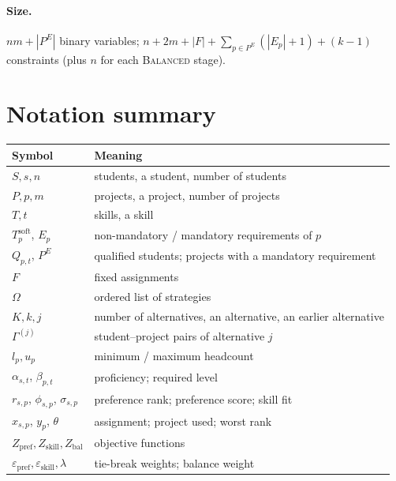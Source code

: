 \documentclass[11pt,a4paper]{article}
\newcommand{\soft}{\mathrm{soft}}
\begin{document}
\paragraph{Size.} $nm + |P^{E}|$ binary variables; $n + 2m + |F| + \sum_{p \in P^{E}} (|E_p| + 1) + (k-1)$ constraints (plus $n$
for each \textsc{Balanced} stage).

\section{Notation summary}
\begin{tabular}{ll}
\toprule
Symbol & Meaning \\
\midrule
$S, s, n$ & students, a student, number of students \\
$P, p, m$ & projects, a project, number of projects \\
$T, t$ & skills, a skill \\
$T_p^{\soft}$, $E_p$ & non-mandatory / mandatory requirements of $p$ \\
$Q_{p,t}$, $P^{E}$ & qualified students; projects with a mandatory requirement \\
$F$ & fixed assignments \\
$\Omega$ & ordered list of strategies \\
$K, k, j$ & number of alternatives, an alternative, an earlier alternative \\
$\Gamma^{(j)}$ & student--project pairs of alternative $j$ \\
$l_p, u_p$ & minimum / maximum headcount \\
$\alpha_{s,t}$, $\beta_{p,t}$ & proficiency; required level \\
$r_{s,p}$, $\phi_{s,p}$, $\sigma_{s,p}$ & preference rank; preference score; skill fit \\
$x_{s,p}$, $y_p$, $\theta$ & assignment; project used; worst rank \\
$Z_{\text{pref}}, Z_{\text{skill}}, Z_{\text{bal}}$ & objective functions \\
$\varepsilon_{\text{pref}}, \varepsilon_{\text{skill}}, \lambda$ & tie-break weights; balance weight \\
\bottomrule
\end{tabular}
\end{document}
